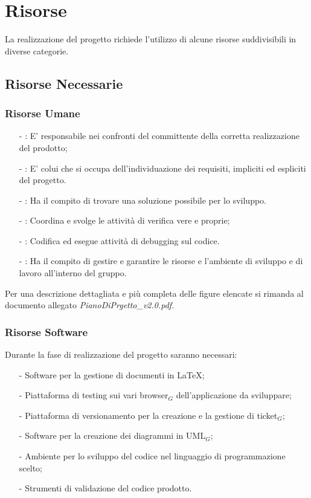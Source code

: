 \section{Risorse} \label{risorse}
La realizzazione del progetto richiede l'utilizzo di alcune risorse suddivisibili in diverse categorie.
\subsection{Risorse Necessarie} 
\subsubsection{Risorse Umane}
\begin{itemize}
	\item[-] \textbf{\ruoloResponsabile}: E' responsabile nei confronti del committente della corretta realizzazione del prodotto;
	\item[-] \textbf{\ruoloAnalista}: E' colui che si occupa dell'individuazione dei requisiti, impliciti ed espliciti del progetto.
	\item[-] \textbf{\ruoloProgettista}: Ha il compito di trovare una soluzione possibile per lo sviluppo.
	\item[-] \textbf{\ruoloVerificatore}: Coordina e svolge le attività di verifica vere e proprie;
	\item[-] \textbf{\ruoloProgrammatore}: Codifica ed esegue attività di debugging sul codice.
	\item[-] \textbf{\ruoloAmministratore}: Ha il compito di gestire e garantire le risorse e l'ambiente di sviluppo e di lavoro all'interno del gruppo.
\end{itemize}
Per una descrizione dettagliata e più completa delle figure elencate si rimanda al documento allegato \textit{PianoDiPrgetto\_v2.0.pdf}.

\subsubsection{Risorse Software}
Durante la fase di realizzazione del progetto saranno necessari:
\begin{itemize}
	\item[-] Software per la gestione di documenti in \LaTeX;
	\item[-] Piattaforma di testing sui vari browser$_G$ dell'applicazione da sviluppare;
	\item[-] Piattaforma di versionamento per la creazione e la gestione di ticket$_G$;
	\item[-] Software per la creazione dei diagrammi in UML$_G$;
	\item[-] Ambiente per lo sviluppo del codice nel linguaggio di programmazione scelto;
	\item[-] Strumenti di validazione del codice prodotto.
\end{itemize}

